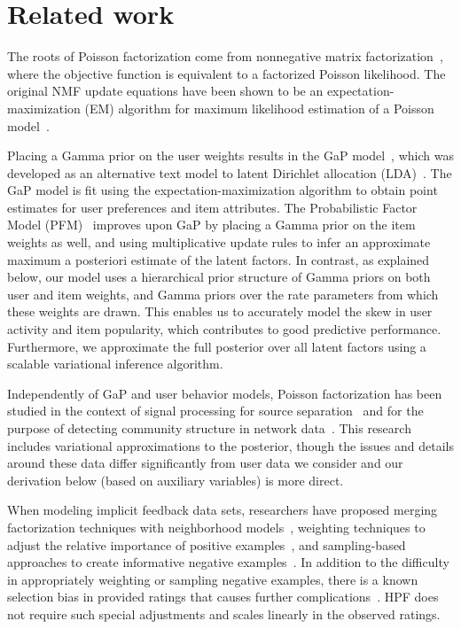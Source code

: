 \section{Related work}
\label{sec:related}
The roots of Poisson factorization come from nonnegative matrix
factorization~\cite{Lee:1999}, where the objective function is
equivalent to a factorized Poisson likelihood.  The original NMF
update equations have been shown to be an expectation-maximization
(EM) algorithm for maximum likelihood estimation of a Poisson
model~\cite{Cemgil:2009}.

Placing a Gamma prior on the user weights results in the GaP
model~\cite{Canny:2004}, which was developed as an alternative text
model to latent Dirichlet allocation
(LDA)~\cite{Blei:2003b,Inouye:2014}. The GaP model is fit using the
expectation-maximization algorithm to obtain point estimates for user
preferences and item attributes. The Probabilistic Factor Model
(PFM)~\cite{Ma:2011} improves upon GaP by placing a Gamma prior on the
item weights as well, and using multiplicative update rules to infer
an approximate maximum a posteriori estimate of the latent factors.
In contrast, as explained below, our model uses a hierarchical prior
structure of Gamma priors on both user and item weights, and Gamma
priors over the rate parameters from which these weights are
drawn. This enables us to accurately model the skew in user activity
and item popularity, which contributes to good predictive
performance. Furthermore, we approximate the full posterior over all
latent factors using a scalable variational inference algorithm.

Independently of GaP and user behavior models, Poisson factorization
has been studied in the context of signal processing for source
separation~\cite{Cemgil:2009,Hoffman:2012} and for the purpose of
detecting community structure in network
data~\cite{Ball:2011,Gopalan:2013}. This research includes variational
approximations to the posterior, though the issues and details around
these data differ significantly from user data we consider and our
derivation below (based on auxiliary variables) is more direct.

When modeling implicit feedback data sets, researchers have proposed
merging factorization techniques with neighborhood
models~\cite{Koren:2008}, weighting techniques to adjust the relative
importance of positive examples~\cite{Hu:2008p9402}, and
sampling-based approaches to create informative negative
examples~\cite{Gantner:2012p9364,Dror:2012a,Paquet:2013p9197}.  In
addition to the difficulty in appropriately weighting or sampling
negative examples, there is a known selection bias in provided ratings
that causes further complications~\cite{Marlin:2012}.  HPF
does not require such special adjustments and scales linearly in the
observed ratings.

